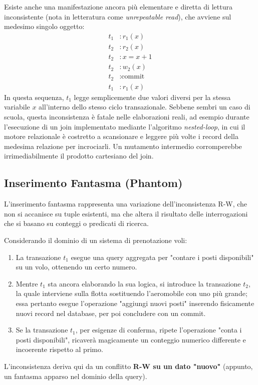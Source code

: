 Esiste anche una manifestazione ancora più elementare e diretta di lettura inconsistente (nota in letteratura come \textit{unrepeatable read}), che avviene sul medesimo singolo oggetto:
\begin{align*}
    t_1&: r_1(x) \\
    t_2&: r_2(x) \\
    t_2&: x = x + 1 \\
    t_2&: w_2(x) \\
    t_2&: \text{commit} \\
    t_1&: r_1(x)
\end{align*}
In questa sequenza, $t_1$ legge semplicemente due valori diversi per la stessa variabile $x$ all'interno dello stesso ciclo transazionale. Sebbene sembri un caso di scuola, questa inconsistenza è fatale nelle elaborazioni reali, ad esempio durante l'esecuzione di un join implementato mediante l'algoritmo \textit{nested-loop}, in cui il motore relazionale è costretto a scansionare e leggere più volte i record della medesima relazione per incrociarli. Un mutamento intermedio corromperebbe irrimediabilmente il prodotto cartesiano del join.

\subsection{Inserimento Fantasma (Phantom)}

L'inserimento fantasma rappresenta una variazione dell'inconsistenza R-W, che non si accanisce su tuple esistenti, ma che altera il risultato delle interrogazioni che si basano su conteggi o predicati di ricerca.

Considerando il dominio di un sistema di prenotazione voli:
\begin{enumerate}
    \item La transazione $t_1$ esegue una query aggregata per "contare i posti disponibili" su un volo, ottenendo un certo numero.
    \item Mentre $t_1$ sta ancora elaborando la sua logica, si introduce la transazione $t_2$, la quale interviene sulla flotta sostituendo l'aeromobile con uno più grande; essa pertanto esegue l'operazione "aggiungi nuovi posti" inserendo fisicamente nuovi record nel database, per poi concludere con un commit.
    \item Se la transazione $t_1$, per esigenze di conferma, ripete l'operazione "conta i posti disponibili", ricaverà magicamente un conteggio numerico differente e incoerente rispetto al primo.
\end{enumerate}
L'inconsistenza deriva qui da un conflitto \textbf{R-W su un dato "nuovo"} (appunto, un fantasma apparso nel dominio della query).

